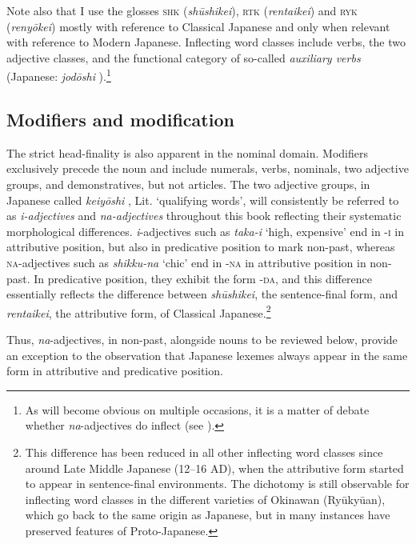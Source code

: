 {Note also that I use the glosses \textsc{shk} (\textit{shūshikei}), \textsc{rtk} (\textit{rentaikei}) and \textsc{ryk} (\textit{renyōkei}) mostly with reference to Classical Japanese and only when relevant with reference to Modern Japanese.} Inflecting word classes include verbs, the two adjective classes, and the functional category of so-called \textit{auxiliary verbs} (Japanese: \textit{jodōshi} ).\footnote{As will become obvious on multiple occasions, it is a matter of debate whether \textit{na}-adjectives do inflect (see \citealt{uehara:1998:syntactic, kishimoto:2016:lexical}).} 

\subsection{Modifiers and modification}

The strict head-finality is also apparent in the nominal domain. Modifiers exclusively precede the noun and include numerals, verbs, nominals, two adjective groups, and demonstratives, but not articles. The two adjective groups, in Japanese called \textit{keiyōshi} , Lit. `qualifying words’, will consistently be referred to as \textit{\textit{i}-adjectives} and \textit{\textit{na}-adjectives} throughout this book reflecting their systematic morphological differences. \textit{i}-adjectives such as \textit{taka-i} `high, expensive’ end in -\textsc{i} in attributive position, but also in predicative position to mark non-past, whereas \textsc{na}-adjectives such as \textit{shikku-na} `chic’ end in -\textsc{na} in attributive position in non-past. In predicative position, they exhibit the form -\textsc{da}, and this difference essentially reflects the difference between \textit{shūshikei}, the sentence-final form, and \textit{rentaikei}, the attributive form, of Classical Japanese.\footnote{This difference has been reduced in all other inflecting word classes since around Late Middle Japanese (12–16 AD), when the attributive form started to appear in sentence-final environments. The dichotomy is still observable for inflecting word classes in the different varieties of Okinawan (Ryūkyūan), which go back to the same origin as Japanese, but in many instances have preserved features of Proto-Japanese.}  

Thus, \textit{na}-adjectives, in non-past, alongside nouns to be reviewed below, provide an exception to the observation that Japanese lexemes always appear in the same form in attributive and predicative position.

